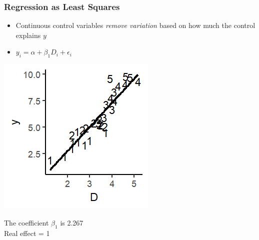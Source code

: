 \documentclass[xcolor=x11names,compress]{beamer}\usepackage[]{graphicx}\usepackage[]{color}
\makeatletter
\def\maxwidth{ %
  \ifdim\Gin@nat@width>\linewidth
    \linewidth
  \else
    \Gin@nat@width
  \fi
}
\newenvironment{knitrout}{}{} %
\renewcommand{\(}{\begin{columns}}
\renewcommand{\)}{\end{columns}}
\newcommand{\<}[1]{\begin{column}{#1}}
\renewcommand{\>}{\end{column}}
\makeatother
\begin{document}
\begin{frame}
\frametitle{Regression as Least Squares}
\begin{itemize}
\item Continuous control variables \textit{remove variation} based on how much the control explains $y$
\item $y_i = \alpha + \beta_1 D_i + \epsilon_i$
\end{itemize}
\begin{multicols}{2}
\begin{knitrout}
\color{fgcolor}
\includegraphics[width=\maxwidth]{figure/graph_ols_control2-1} 

\end{knitrout}
\columnbreak
The coefficient $\beta_1$ is 2.267 \\
Real effect = 1
\end{multicols}
\end{frame}
\end{document}
